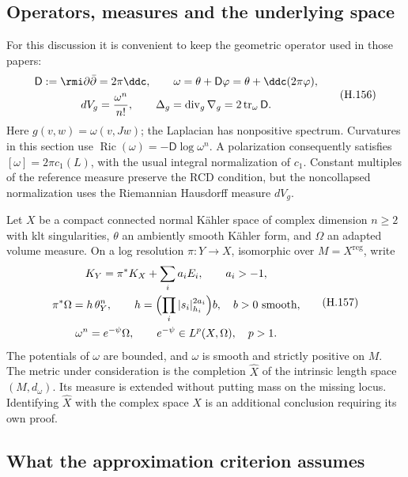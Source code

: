 \subsection{Operators, measures and the underlying space}

For this discussion it is convenient to keep the geometric operator
used in those papers:
\[
 \begin{gathered}
 \mathsf D:=\rmi\partial\bar\partial=2\pi\ddc,\qquad
 \omega=\theta+\mathsf D\varphi
              =\theta+\ddc(2\pi\varphi),\\
 dV_g=\frac{\omega^n}{n!},\qquad
 \Delta_g=\operatorname{div}_g\nabla_g
                 =2\operatorname{tr}_{\omega}\mathsf D .
 \end{gathered}
 \tag{H.156}\label{eq:appH-ricci-operator}
\]
Here \(g(v,w)=\omega(v,Jw)\); the Laplacian has nonpositive
spectrum. Curvatures in this section use
\(\operatorname{Ric}(\omega)=-\mathsf D\log\omega^n\).
A polarization consequently satisfies
\([\omega]=2\pi c_1(L)\), with the usual integral normalization
of \(c_1\). Constant multiples of the reference measure preserve
the RCD condition, but the noncollapsed normalization uses the
Riemannian Hausdorff measure \(dV_g\).

Let \(X\) be a compact connected normal Kähler space of complex
dimension \(n\geq2\) with klt singularities, \(\theta\) an
ambiently smooth Kähler form, and
\(\Omega\) an adapted volume measure. On a log resolution
\(\pi:Y\to X\), isomorphic over \(M=X^{\mathrm{reg}}\), write
\[
 \begin{gathered}
 K_Y=\pi^*K_X+\sum_i a_iE_i,\qquad a_i>-1,\\
 \pi^*\Omega=h\,\theta_Y^n,\qquad
 h=\Bigl(\prod_i|s_i|_{h_i}^{2a_i}\Bigr)b,\quad b>0
                    \text{ smooth},\\
 \omega^n=e^{-\psi}\Omega,\qquad
 e^{-\psi}\in L^p(X,\Omega),\quad p>1.
 \end{gathered}
 \tag{H.157}\label{eq:appH-ricci-adapted-volume}
\]
The potentials of \(\omega\) are bounded, and \(\omega\) is smooth
and strictly positive on \(M\). The metric under consideration is
the completion \(\widehat X\) of the intrinsic length space
\((M,d_\omega)\). Its measure is extended without putting mass
on the missing locus. Identifying \(\widehat X\) with the complex
space \(X\) is an additional conclusion requiring its own proof.

\subsection{What the approximation criterion assumes}

